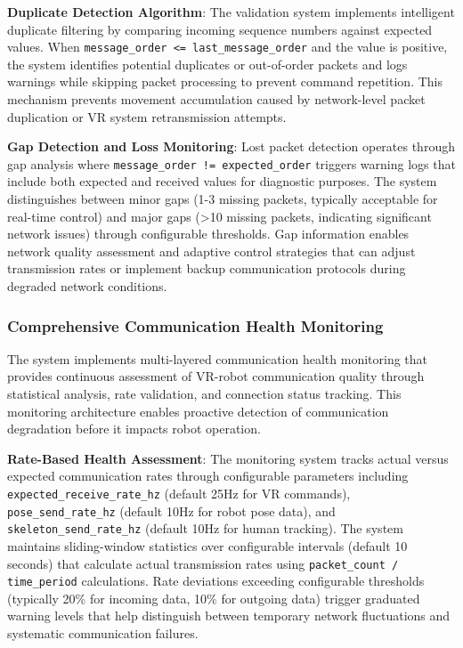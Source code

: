 \textbf{Duplicate Detection Algorithm}: The validation system implements intelligent duplicate filtering by comparing incoming sequence numbers against expected values. When \texttt{message\_order <= last\_message\_order} and the value is positive, the system identifies potential duplicates or out-of-order packets and logs warnings while skipping packet processing to prevent command repetition. This mechanism prevents movement accumulation caused by network-level packet duplication or VR system retransmission attempts.

\textbf{Gap Detection and Loss Monitoring}: Lost packet detection operates through gap analysis where \texttt{message\_order != expected\_order} triggers warning logs that include both expected and received values for diagnostic purposes. The system distinguishes between minor gaps (1-3 missing packets, typically acceptable for real-time control) and major gaps (>10 missing packets, indicating significant network issues) through configurable thresholds. Gap information enables network quality assessment and adaptive control strategies that can adjust transmission rates or implement backup communication protocols during degraded network conditions.

\subsubsection{Comprehensive Communication Health Monitoring}

The system implements multi-layered communication health monitoring that provides continuous assessment of VR-robot communication quality through statistical analysis, rate validation, and connection status tracking. This monitoring architecture enables proactive detection of communication degradation before it impacts robot operation.

\textbf{Rate-Based Health Assessment}: The monitoring system tracks actual versus expected communication rates through configurable parameters including \texttt{expected\_receiv}\linebreak\texttt{e\_rate\_hz} (default 25Hz for VR commands), \texttt{pose\_send\_rate\_hz} (default 10Hz for robot pose data), and \texttt{skeleton\_send\_rate\_hz} (default 10Hz for human tracking). The system maintains sliding-window statistics over configurable intervals (default 10 seconds) that calculate actual transmission rates using \texttt{packet\_count / time\_period} calculations. Rate deviations exceeding configurable thresholds (typically 20\% for incoming data, 10\% for outgoing data) trigger graduated warning levels that help distinguish between temporary network fluctuations and systematic communication failures.

